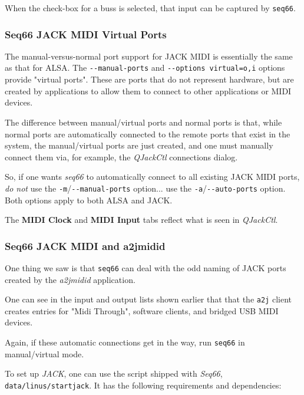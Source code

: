   When the check-box for a buss is selected, that input can be captured by
   \texttt{seq66}.

\subsubsection{Seq66 JACK MIDI Virtual Ports}
\label{subsubsec:jack_midi_virtual_ports}

   The manual-versus-normal port support for JACK MIDI is essentially the same
   as that for ALSA.
   The \texttt{-{}-manual-ports} and
   \texttt{-{}-options virtual=o,i} options provide
   "virtual ports".  These are ports that do not represent
   hardware, but are created by applications to allow them to connect to other
   applications or MIDI devices.

   The difference between manual/virtual ports and normal ports is that, while
   normal ports are automatically connected to the remote ports that exist in
   the system, the manual/virtual ports are just created, and one must
   manually connect them via, for example, the
   \textsl{QJackCtl} connections dialog.

   So, if one wants \textsl{seq66} to automatically connect to all existing
   JACK MIDI ports, \textsl{do not} use the
   \texttt{-m}/\texttt{-{}-manual-ports} option... use the
   \texttt{-a}/\texttt{-{}-auto-ports} option.  Both options apply to both
   ALSA and JACK.

   The \textbf{MIDI Clock} and \textbf{MIDI Input} tabs reflect
   what is seen in \textsl{QJackCtl}.

\subsubsection{Seq66 JACK MIDI and a2jmidid}
\label{subsubsec:jack_midi_a2jmidid}

   One thing we saw is that \texttt{seq66} can deal with the odd naming
   of JACK ports created by the \textsl{a2jmidid} application.

   One can see in the input and output lists shown earlier
   that that the \texttt{a2j} client creates entries for "Midi Through",
   software clients, and bridged USB MIDI devices.

   Again, if these automatic connections get in the way, run \texttt{seq66} in
   manual/virtual mode.

   To set up \textsl{JACK}, one can use the script shipped with
   \textsl{Seq66}, \texttt{data/linus/startjack}.  It has the following
   requirements and dependencies:

